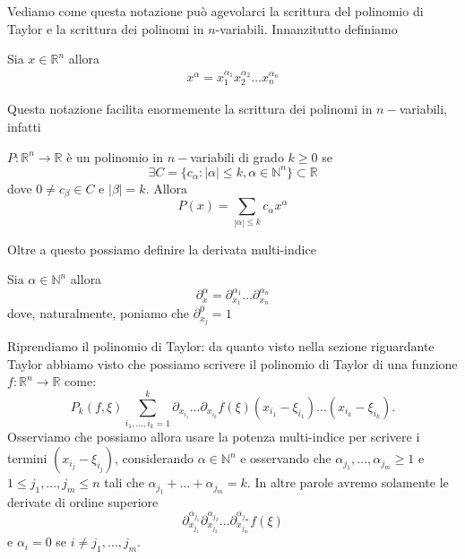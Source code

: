 \vspace{0.5cm}
Vediamo come questa notazione può agevolarci la scrittura del polinomio di Taylor e la scrittura dei polinomi in $n$-variabili. Innanzitutto definiamo
%
\begin{definition}[\textcolor{blue}{potenza multi-indice}]
	Sia $x \in \mathbb{R}^n$ allora
	\begin{align*}
		x^{\alpha} = x_1^{\alpha_1} x_2^{\alpha_2} \ldots x_n^{\alpha_n}
	\end{align*}
\end{definition}
\vspace{0.5cm}
Questa notazione facilita enormemente la scrittura dei polinomi in $n-$variabili, infatti
%
\begin{definition}[\textcolor{blue}{polinomio in $n-$variabili}]
	$P: \mathbb{R}^n \to \mathbb{R}$ è un polinomio in $n-$variabili di grado $k \geq 0$ se
	$$
	\exists C = \{c_\alpha : |\alpha| \leq k, \alpha \in \mathbb{N}^n \} \subset \mathbb{R} 
	$$
	dove $0 \neq c_\beta \in C$ e $|\beta| = k$. Allora
	$$
	P(x) = \sum_{|\alpha| \leq k} c_\alpha x^{\alpha}
	$$
\end{definition}
\vspace{0.5cm}
Oltre a questo possiamo definire la derivata multi-indice
%
\begin{definition}[\textcolor{blue}{derivata multi-indice}]
	Sia $\alpha \in \mathbb{N}^n$ allora 
	$$
	\partial^{\alpha}_x = \partial_{x_1}^{\alpha_1} \ldots \partial_{x_n}^{\alpha_n}
	$$
	dove, naturalmente, poniamo che $\partial_{x_j}^0 = 1$
\end{definition}

\vspace{0.5cm}
Riprendiamo il polinomio di Taylor: da quanto visto nella sezione riguardante Taylor abbiamo visto che possiamo scrivere il polinomio di Taylor di una funzione $f: \mathbb{R}^n \to \mathbb{R}$ come:
\[
P_k(f, \xi)\sum_{i_1, \ldots, i_k=1}^k \partial_{x_{i_1}} \ldots \partial_{x_{i_k}} f(\xi) (x_{i_1} - \xi_{i_1}) \ldots (x_{i_k} - \xi_{i_k}).
\]
Osserviamo che possiamo allora usare la potenza multi-indice per scrivere i termini $(x_{i_j} - \xi_{i_j})$, considerando $\alpha \in \mathbb{N}^n$ e osservando che $\alpha_{j_1}, \ldots, \alpha_{j_m} \geq 1$ e $1 \leq j_1, \ldots, j_m \leq n$ tali che $\alpha_{j_1} + \ldots + \alpha_{j_m} = k$. In altre parole avremo solamente le derivate di ordine superiore
\[
\partial_{x_{j_1}}^{\alpha_{j_1}} \partial_{x_{j_2}}^{\alpha_{j_2}} \ldots \partial_{x_{j_m}}^{\alpha_{j_m}} f(\xi)
\]
e $\alpha_i = 0$ se $i \neq j_1, \ldots, j_m$. 

